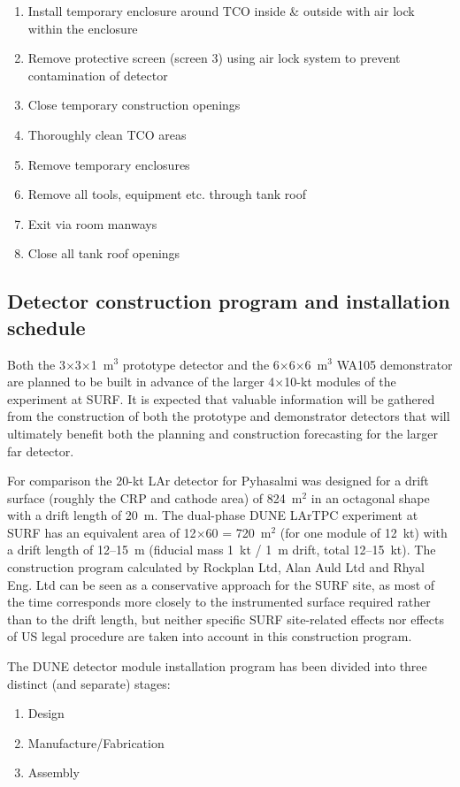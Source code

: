 \begin{enumerate}
\item{Install temporary enclosure around TCO inside \& outside with air lock within the enclosure}
\item{ Remove protective screen (screen 3) using air lock system to prevent contamination of detector}
\item{Close temporary construction openings}
\item{Thoroughly clean TCO areas}
\item{Remove temporary enclosures}
\item{Remove all tools, equipment etc. through tank roof}
\item{Exit via room manways}
\item{Close all tank roof openings}
\end{enumerate}

\subsection{Detector construction program and installation schedule}

Both the 3$\times$3$\times$1~m$^3$ prototype detector and the
6$\times$6$\times$6~m$^3$ WA105 demonstrator are planned to be built in
advance of the larger 4$\times$10-kt modules of the experiment at
SURF. It is expected that valuable information will be gathered
from the construction of both the prototype and demonstrator detectors
that will ultimately benefit both the planning and construction
forecasting for the larger far detector. 

For comparison the 20-kt LAr detector for Pyhasalmi was designed for a
drift surface (roughly the CRP and cathode area) of 824~m$^2$ in an
octagonal shape with a drift length of 20~m. The dual-phase DUNE
LArTPC experiment at SURF has an equivalent area of 12$\times$60 =
720~m$^2$ (for one module of 12~kt) with a drift length of 12--15~m
(fiducial mass 1~kt / 1~m drift, total 12--15~kt). The construction
program calculated by Rockplan Ltd, Alan Auld Ltd and Rhyal Eng. Ltd
can be seen as a conservative approach for the SURF site, as most
of the time corresponds more closely to
the instrumented surface required  rather than to 
the drift length, but neither specific SURF site-related
effects nor effects of US legal procedure are  taken into account
in this construction program.

The DUNE detector module installation program has been divided into three distinct (and separate)
stages:
\begin{enumerate}
\item{Design}
\item{Manufacture/Fabrication} 
\item{Assembly}
\end{enumerate}  

